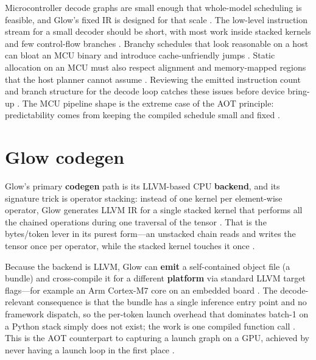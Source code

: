 Microcontroller decode graphs are small enough that whole-model scheduling is feasible, and Glow's fixed IR is designed for that scale \citep{rotem2018glow,amd2024aie}. The low-level instruction stream for a small decoder should be short, with most work inside stacked kernels and few control-flow branches \citep{rotem2018glow,memoryfloor2026}. Branchy schedules that look reasonable on a host can bloat an MCU binary and introduce cache-unfriendly jumps \citep{dlbook,taxbreak2026}. Static allocation on an MCU must also respect alignment and memory-mapped regions that the host planner cannot assume \citep{amd2024aie,patel2025llminference}. Reviewing the emitted instruction count and branch structure for the decode loop catches these issues before device bring-up \citep{chen2020compilerbasedhardw,memoryfloor2026}. The MCU pipeline shape is the extreme case of the AOT principle: predictability comes from keeping the compiled schedule small and fixed \citep{rotem2018glow,taxbreak2026}.

\section{Glow codegen}
\label{sec:ch19_glow_codegen}

Glow's primary \textbf{codegen} path is its LLVM-based CPU \textbf{backend}, and its signature trick is operator stacking: instead of one kernel per element-wise operator, Glow generates LLVM IR for a single stacked kernel that performs all the chained operations during one traversal of the tensor \citep{pytorchglow2024,rotem2018glow}. That is the bytes/token lever in its purest form---an unstacked chain reads and writes the tensor once per operator, while the stacked kernel touches it once \citep{taxbreak2026,memoryfloor2026}.

Because the backend is LLVM, Glow can \textbf{emit} a self-contained object file (a bundle) and cross-compile it for a different \textbf{platform} via standard LLVM target flags---for example an Arm Cortex-M7 core on an embedded board \citep{pytorchglow2024}. The decode-relevant consequence is that the bundle has a single inference entry point and no framework dispatch, so the per-token launch overhead that dominates batch-1 on a Python stack simply does not exist; the work is one compiled function call \citep{taxbreak2026,nvidia2024cudagraphs}. This is the AOT counterpart to capturing a launch graph on a GPU, achieved by never having a launch loop in the first place \citep{memoryfloor2026}.

